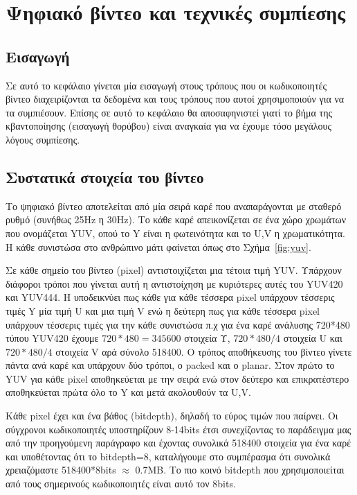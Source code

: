 ﻿\chapter{Ψηφιακό βίντεο και τεχνικές συμπίεσης}
\label{chapter:chap2}


\section{Εισαγωγή}
\label{section:sect21}
\indent Σε αυτό το κεφάλαιο γίνεται μία εισαγωγή στους τρόπους που οι κωδικοποιητές βίντεο διαχειρίζονται τα δεδομένα και τους τρόπους που αυτοί χρησιμοποιούν για να τα συμπιέσουν. Επίσης σε αυτό το κεφάλαιο θα αποσαφηνιστεί γιατί το βήμα της κβαντοποίησης (εισαγωγή θορύβου) είναι αναγκαία για να έχουμε τόσο μεγάλους λόγους συμπίεσης.

\section{Συστατικά στοιχεία του βίντεο}
\label{section:sect22}

\indent Το ψηφιακό βίντεο αποτελείται από μία σειρά καρέ που αναπαράγονται με σταθερό ρυθμό (συνήθως 25Hz η 30Hz). Το κάθε καρέ απεικονίζεται σε ένα χώρο χρωμάτων που ονομάζεται YUV, οπού το Y είναι η φωτεινότητα και το U,V η χρωματικότητα. Η κάθε συνιστώσα στο ανθρώπινο μάτι φαίνεται όπως στο Σχήμα~\ref{fig:yuv}.

\indent Σε κάθε σημείο του βίντεο (pixel) αντιστοιχίζεται μια τέτοια τιμή YUV. Υπάρχουν διάφοροι τρόποι που γίνεται αυτή η αντιστοίχηση με κυριότερες αυτές του YUV420 και YUV444. Η υποδεικνύει πως κάθε για κάθε τέσσερα pixel υπάρχουν τέσσερις τιμές Y μία τιμή U και μια τιμή V ενώ η δεύτερη πως για κάθε τέσσερα pixel υπάρχουν τέσσερις τιμές για την κάθε συνιστώσα π.χ για ένα καρέ ανάλυσης 720*480 τύπου YUV420 έχουμε \(720*480=345600\) στοιχεία Υ, \(720*480/4\) στοιχεία U και \(720*480/4 \) στοιχεία V αρά σύνολο 518400. Ο τρόπος αποθήκευσης του βίντεο γίνετε πάντα ανά καρέ και υπάρχουν δύο τρόποι, ο packed και ο planar. Στον πρώτο το YUV για κάθε pixel αποθηκεύεται με την σειρά ενώ στον δεύτερο και επικρατέστερο αποθηκεύεται πρώτα όλο το Y και μετά ακολουθούν τα U,V.

\indent Κάθε pixel έχει και ένα βάθος (bitdepth), δηλαδή το εύρος τιμών που παίρνει. Οι σύγχρονοι κωδικοποιητές υποστηρίζουν 8-14bits έτσι συνεχίζοντας το παράδειγμα μας από την προηγούμενη παράγραφο και έχοντας συνολικά 518400 στοιχεία για ένα καρέ και υποθέτοντας ότι το bitdepth=8, καταλήγουμε στο συμπέρασμα ότι συνολικά χρειαζόμαστε 518400*8bits $\approx$ 0.7MB. Το πιο κοινό bitdepth που χρησιμοποιείται από τους σημερινούς κωδικοποιητές είναι αυτό τον 8bits.

